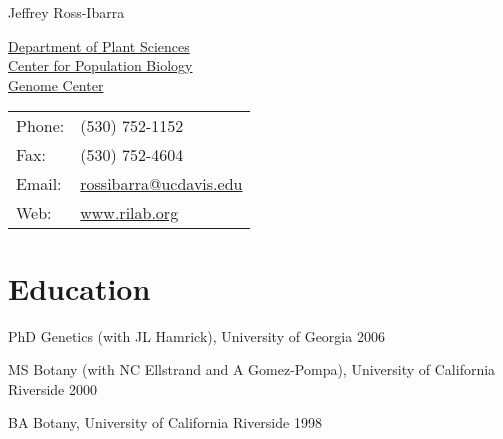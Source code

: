 \documentclass[letterpaper]{article}
\def\name{Jeffrey Ross-Ibarra}
\renewenvironment{itemize}{
  \begin{list}{}{
    \setlength{\leftmargin}{1.5em}
  }
}{
  \end{list}
}
\begin{document}
{\huge \name}


\vspace{0.25in}

\begin{minipage}{0.55\linewidth}
  \href{http://www.plantsciences.ucdavis.edu/plantsciences/}{Department of Plant Sciences}\\
  \href{http://cpb.ucdavis.edu/}{Center for Population Biology}\\
  \href{http://www.genomecenter.ucdavis.edu/}{Genome Center}\\

\end{minipage}
\begin{minipage}{0.35\linewidth}
  \begin{tabular}{ll}
    Phone: & (530) 752-1152 \\
    Fax: &  (530) 752-4604 \\
    Email: & \href{mailto:rossibarra@ucdavis.edu}{rossibarra@ucdavis.edu} \\
    Web: & \href{http://www.rilab.org/}{www.rilab.org} \\
  \end{tabular}
\end{minipage}

\section*{Education}
\begin{itemize}
 \item PhD Genetics (with JL Hamrick), University of Georgia 2006
  \item MS Botany (with NC Ellstrand and A Gomez-Pompa), University of California Riverside 2000 
 \item BA Botany, University of California Riverside 1998 
\end{itemize}

\end{document}
